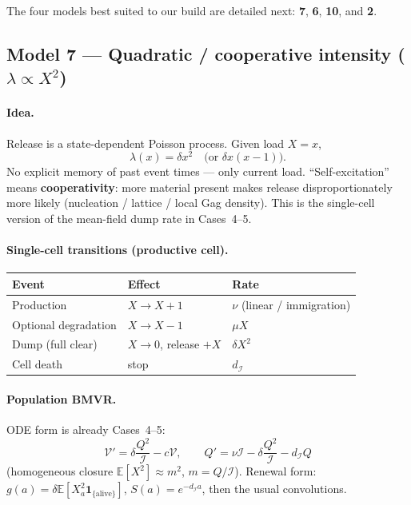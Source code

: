\documentclass[11pt,a4paper]{article}
\newcommand{\E}{\mathbb{E}}
\newcommand{\Icell}{\mathcal{I}}
\newcommand{\Vfree}{\mathcal{V}}
\theoremstyle{plain}
\theoremstyle{definition}
\theoremstyle{remark}
\begin{document}
The four models best suited to our build are detailed next: \textbf{7},
\textbf{6}, \textbf{10}, and \textbf{2}.

\subsection{Model 7 --- Quadratic / cooperative intensity ($\lambda\propto X^2$)}

\paragraph{Idea.}
Release is a state-dependent Poisson process. Given load $X=x$,
\[
\lambda(x)=\delta x^2
\quad\text{(or }\delta x(x-1)\text{)}.
\]
No explicit memory of past event times --- only current load.
``Self-excitation'' means \textbf{cooperativity}: more material present makes
release disproportionately more likely (nucleation / lattice / local Gag
density). This is the single-cell version of the mean-field dump rate in
Cases~4--5.

\paragraph{Single-cell transitions (productive cell).}
\begin{center}
\renewcommand{\arraystretch}{1.15}
\begin{tabular}{@{}lll@{}}
\toprule
Event & Effect & Rate \\
\midrule
Production & $X\to X+1$ & $\nu$ (linear / immigration) \\
Optional degradation & $X\to X-1$ & $\mu X$ \\
Dump (full clear) & $X\to 0$, release $+X$ & $\delta X^2$ \\
Cell death & stop & $d_{\Icell}$ \\
\bottomrule
\end{tabular}
\end{center}

\paragraph{Population BMVR.}
ODE form is already Cases~4--5:
\[
\Vfree'
=\delta\frac{Q^2}{\Icell}-c\Vfree,
\qquad
Q'
=\nu\Icell-\delta\frac{Q^2}{\Icell}-d_{\Icell}Q
\]
(homogeneous closure $\E[X^2]\approx m^2$, $m=Q/\Icell$). Renewal form:
$g(a)=\delta\E[X_a^2\mathbf 1_{\{\mathrm{alive}\}}]$, $S(a)=e^{-d_{\Icell}a}$,
then the usual convolutions.
\end{document}
